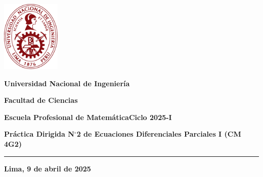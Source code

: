 



\noindent\parbox[c]{.18\textwidth}{\includegraphics[width=2.8cm]{logouni}}\hfill
\parbox[c]{1\textwidth}{\raggedright%
    {\large\textbf{Universidad Nacional de Ingeniería} \par\smallskip}
    {\large\textbf{Facultad de Ciencias} \par\smallskip}
    {\large\textbf{Escuela Profesional de Matemática}\hfil\qquad\qquad\qquad\textbf{Ciclo 2025-I}}
}

\begin{center}\bfseries\large
    Práctica Dirigida N$^{\circ}$2 de Ecuaciones Diferenciales
    Parciales I (CM 4G2)
\end{center}

\vspace{-0.5cm}

\hrulefill
\vspace{-2.5mm}

\rule{16.5cm}{0.8mm}

\begin{questions}
    
\end{questions}

\vfill
\begin{flushright}\bfseries
    Lima, 9 de abril de 2025
\end{flushright}

\clearpage

\appendix



